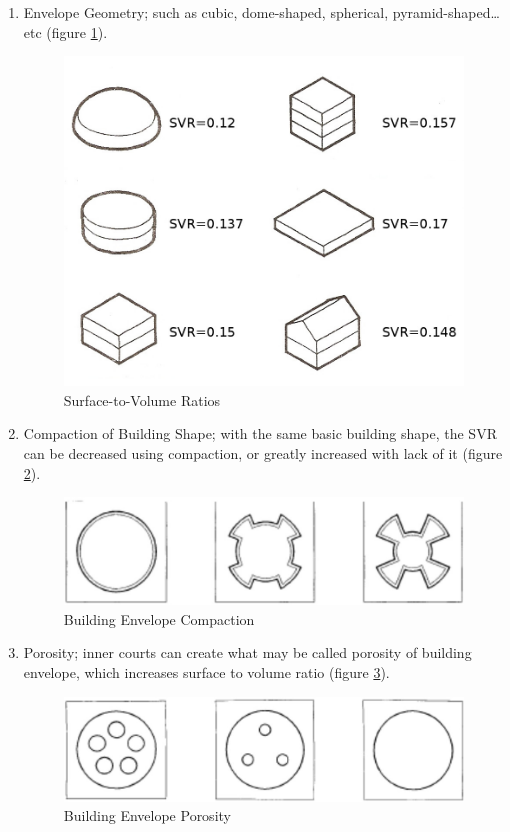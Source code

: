 \begin{enumerate}
	\item Envelope Geometry; such as cubic, dome-shaped, spherical, pyramid-shaped\ldots{}etc (figure \ref{fig:SVR}).
		\begin{figure}[h]
			\centering
			\includegraphics[width=\textwidth]{./Images/3-SVR}
			\caption{Surface-to-Volume Ratios}
			\label{fig:SVR}
		\end{figure}
	\item Compaction of Building Shape; with the same basic building shape, the SVR can be decreased using compaction, or greatly increased with		  lack of it (figure \ref{fig:Compaction}).
		\begin{figure}[h]
			\centering
			\includegraphics[width=\textwidth]{./Images/4-Compaction}
			\caption{Building Envelope Compaction}
			\label{fig:Compaction}
		\end{figure}
	\item Porosity; inner courts can create what may be called porosity of building envelope, which increases surface to volume ratio (figure 		\ref{fig:Porosity}).
		\begin{figure}[h]
			\centering
			\includegraphics[width=\textwidth]{./Images/5-Porosity}
			\caption{Building Envelope Porosity}
			\label{fig:Porosity}
		\end{figure}
\end{enumerate}

